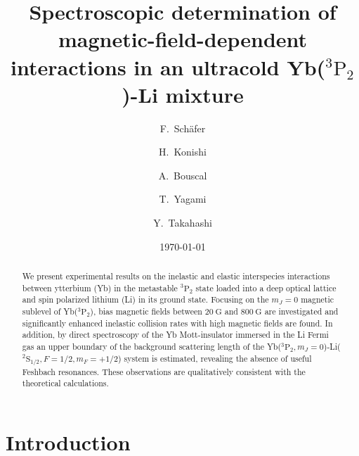 \documentclass[twocolumn,superscriptaddress,showpacs,floatfix,amsmath,amssymb]{revtex4-1}
\newcommand{\triplet}{{}^3\mathrm{P}_2}
\newcommand{\Li}{{}^2\mathrm{S}_{1/2}}
\newcommand{\G}{\mathrm{G}}
\begin{document}
\title{Spectroscopic determination of magnetic-field-dependent interactions in an ultracold Yb($\triplet$)-Li mixture}

\author{F.~Sch\"{a}fer}

\author{H.~Konishi}

\author{A.~Bouscal}

\author{T.~Yagami}

\author{Y.~Takahashi}

\date{\today}

\begin{abstract}
	We present experimental results on the inelastic and elastic interspecies
	interactions between ytterbium (Yb) in the metastable $\triplet$ state
	loaded into a deep optical lattice and spin polarized lithium (Li) in its
	ground state. Focusing on the $m_J = 0$ magnetic sublevel of Yb($\triplet$),
	bias magnetic fields between $20~\G$ and $800~\G$ are investigated and
	significantly enhanced inelastic collision rates with high magnetic fields
	are found. In addition, by direct spectroscopy of the Yb Mott-insulator immersed
	in the Li Fermi gas an upper boundary of the background scattering length of
	the Yb($\triplet, m_J=0$)-Li($\Li, F=1/2, m_F=+1/2$) system is estimated,
	revealing the absence of useful Feshbach resonances. These observations are
	qualitatively consistent with the theoretical calculations.
\end{abstract}

\maketitle

\section{Introduction}
\end{document}

